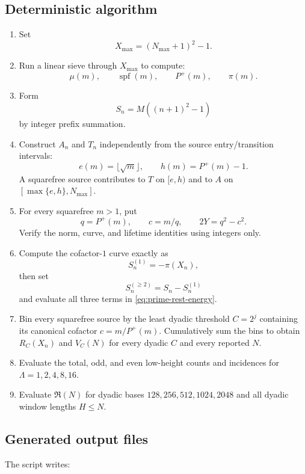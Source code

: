 \documentclass[11pt]{article}
\theoremstyle{definition}
\theoremstyle{remark}
\newcommand{\Pplus}{P^{+}}
\newcommand{\1}{\mathbf{1}}
\begin{document}
\subsection{Deterministic algorithm}

\begin{enumerate}[leftmargin=1.7em,itemsep=0.3em]
\item Set
\[
 X_{\max}=(N_{\max}+1)^2-1.
\]
\item Run a linear sieve through $X_{\max}$ to compute:
\[
 \mu(m),\qquad
 \operatorname{spf}(m),\qquad
 \Pplus(m),\qquad
 \pi(m).
\]
\item Form
\[
 S_n=M((n+1)^2-1)
\]
by integer prefix summation.
\item Construct $A_n$ and $T_n$ independently from the source
entry/transition intervals:
\[
 e(m)=\lfloor\sqrt m\rfloor,
 \qquad
 h(m)=\Pplus(m)-1.
\]
A squarefree source contributes to $T$ on $[e,h)$ and to $A$ on
$[\max\{e,h\},N_{\max}]$.
\item For every squarefree $m>1$, put
\[
 q=\Pplus(m),
 \qquad
 c=m/q,
 \qquad
 2Y=q^2-c^2.
\]
Verify the norm, curve, and lifetime identities using integers only.
\item Compute the cofactor-$1$ curve exactly as
\[
 S_n^{(1)}=-\pi(X_n),
\]
then set
\[
 S_n^{(\ge2)}=S_n-S_n^{(1)}
\]
and evaluate all three terms in
\cref{eq:prime-rest-energy}.
\item Bin every squarefree source by the least dyadic threshold
$C=2^j$ containing its canonical cofactor $c=m/\Pplus(m)$.  Cumulatively
sum the bins to obtain $R_C(X_n)$ and $V_C(N)$ for every dyadic $C$ and
every reported $N$.
\item Evaluate the total, odd, and even low-height counts and incidences
for $\Lambda=1,2,4,8,16$.
\item Evaluate $\mathfrak R(N)$ for dyadic bases
$128,256,512,1024,2048$ and all dyadic window lengths $H\le N$.
\end{enumerate}

\subsection{Generated output files}

The script writes:
\end{document}
